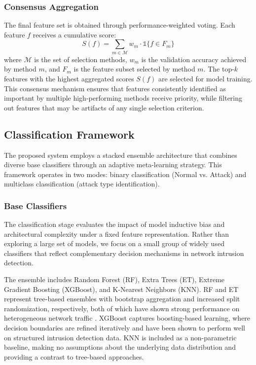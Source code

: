 \documentclass[pdflatex,sn-mathphys-num]{sn-jnl}
\theoremstyle{thmstyleone}%
\theoremstyle{thmstyletwo}%
\theoremstyle{thmstylethree}%
\begin{document}
\subsubsection{Consensus Aggregation}

The final feature set is obtained through performance-weighted voting. 
Each feature $f$ receives a cumulative score:
\begin{equation*}
    S(f) = \sum_{m \in \mathcal{M}} w_m \cdot \mathds{1}\{f \in F_m\}
\end{equation*}
where $\mathcal{M}$ is the set of selection methods, $w_m$ is the validation accuracy achieved by method $m$, and $F_m$ is the feature subset selected by method $m$. The top-$k$ features with the highest aggregated scores $S(f)$ are selected for model training. This consensus mechanism ensures that features consistently identified as important by multiple high-performing methods receive priority, while filtering out features that may be artifacts of any single selection criterion.

\subsection{Classification Framework}
The proposed system employs a stacked ensemble architecture that combines diverse base classifiers through an adaptive meta-learning strategy. This framework operates in two modes: binary classification (Normal vs. Attack) and multiclass classification (attack type identification).

\subsubsection{Base Classifiers}
The classification stage evaluates the impact of model inductive bias and architectural complexity under a fixed feature representation. Rather than exploring a large set of models, we focus on a small group of widely used classifiers that reflect complementary decision mechanisms in network intrusion detection.

The ensemble includes Random Forest (RF), Extra Trees (ET), Extreme Gradient Boosting (XGBoost), and K-Nearest Neighbors (KNN). RF and ET represent tree-based ensembles with bootstrap aggregation and increased split randomization, respectively, both of which have shown strong performance on heterogeneous network traffic \cite{kocher2018performance}\cite{husain2019xgboost}\cite{sharma2019multilayer}. XGBoost captures boosting-based learning, where decision boundaries are refined iteratively and have been shown to perform well on structured intrusion detection data. KNN is included as a non-parametric baseline, making no assumptions about the underlying data distribution and providing a contrast to tree-based approaches.
\end{document}
